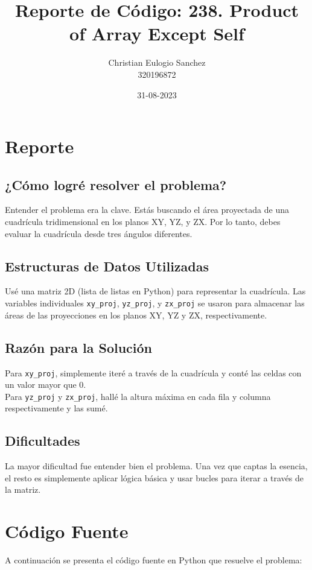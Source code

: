 \documentclass[12pt]{article}
\title{Reporte de Código: 238. Product of Array Except Self}
\author{Christian Eulogio Sanchez \\ 320196872}
\date{31-08-2023}
\begin{document}
\maketitle

\section{Reporte}

\subsection{¿Cómo logré resolver el problema?}
Entender el problema era la clave. Estás buscando el área proyectada de una cuadrícula tridimensional en los planos XY, YZ, y ZX. Por lo tanto, debes evaluar la cuadrícula desde tres ángulos diferentes.

\subsection{Estructuras de Datos Utilizadas}
Usé una matriz 2D (lista de listas en Python) para representar la cuadrícula. Las variables individuales \texttt{xy\_proj}, \texttt{yz\_proj}, y \texttt{zx\_proj} se usaron para almacenar las áreas de las proyecciones en los planos XY, YZ y ZX, respectivamente.

\subsection{Razón para la Solución}
Para \texttt{xy\_proj}, simplemente iteré a través de la cuadrícula y conté las celdas con un valor mayor que 0. \\
Para \texttt{yz\_proj} y \texttt{zx\_proj}, hallé la altura máxima en cada fila y columna respectivamente y las sumé.

\subsection{Dificultades}
La mayor dificultad fue entender bien el problema. Una vez que captas la esencia, el resto es simplemente aplicar lógica básica y usar bucles para iterar a través de la matriz.

\section{Código Fuente}

A continuación se presenta el código fuente en Python que resuelve el problema:
\end{document}
